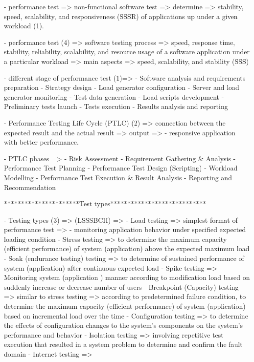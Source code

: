 - performance test => non-functional software test => determine => stability, speed, scalability, and responsiveness (SSSR) of applications up under a given workload (1). 

- performance test (4) => software testing process => speed, response time, stability, reliability, scalability, and resource usage of a software application under a particular workload => main aspects => speed, scalability, and stability (SSS) 

- different stage of performance test (1)=> 
      - Software analysis and requirements preparation
      - Strategy design
      - Load generator configuration
      - Server and load generator monitoring
      - Test data generation
      - Load scripts development
      - Preliminary tests launch
      - Tests execution
      - Results analysis and reporting


- Performance Testing Life Cycle (PTLC) (2) => connection between the expected result and the actual result => output =>
    - responsive application with better performance.

- PTLC phases =>
    - Risk Assessment
    - Requirement Gathering & Analysis
    - Performance Test Planning
    - Performance Test Design (Scripting)
    - Workload Modelling 
    - Performance Test Execution & Result Analysis
    - Reporting and Recommendation

**********************Test types****************************

- Testing types (3) => (LSSSBCII) =>
    - Load testing => simplest format of performance test =>
        - monitoring application behavior under specified expected loading condition 
    - Stress testing => to determine the maximum capacity (efficient performance) of system (application) above the expected maximum load 
    - Soak (endurance testing) testing => to determine of sustained performance of system (application) after   continuous expected load
    - Spike testing => Monitoring system (application ) manner according to modification load based on suddenly increase or decrease number of users
    - Breakpoint (Capacity) testing  => similar to stress testing => according to predetermined failure condition, to determine the maximum capacity (efficient performance) of system (application)  based on incremental load over the time 
    - Configuration testing => to determine the effects of configuration changes to the system's components on the system's performance and behavior
    - Isolation testing => involving repetitive test execution that resulted in a system problem to determine and confirm  the fault domain
    - Internet testing => 



